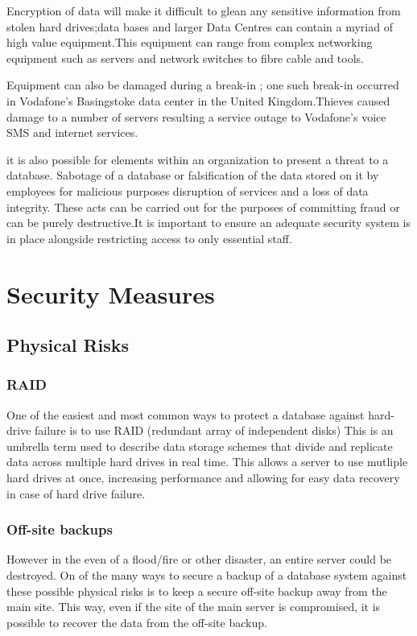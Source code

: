 \documentclass[11pt, twocolumn]{article}
\begin{document}
Encryption of data will make it  difficult to glean any sensitive information from stolen hard drives;data bases and larger Data Centres can contain a myriad of high value equipment.This equipment can range from complex networking equipment such as servers and network switches to fibre cable and tools.

Equipment can also be damaged during a break-in ; one such break-in occurred in Vodafone’s Basingstoke data center in the United Kingdom\cite{sean8}.Thieves caused damage to a number of servers resulting a service outage to Vodafone's voice SMS and internet services.

it is also possible for elements within an organization to present a threat to a database. Sabotage of a database or falsification of the data stored on it by  employees for malicious purposes disruption of services and a loss of data integrity. These acts can be carried out for the purposes of committing fraud or can be purely destructive.It is important to ensure an adequate security system is in place alongside restricting access to only essential staff.


\section{Security Measures}
\subsection{Physical Risks}

\subsubsection{RAID}

One of the easiest and most common ways to protect a database against hard-drive failure is to use RAID (redundant array of independent disks)\cite{raid} This is an umbrella term used to describe data storage schemes that divide and replicate data across multiple hard drives in real time. This allows a server to use mutliple hard drives at once, increasing performance and allowing for easy data recovery in case of hard drive failure.

\subsubsection{Off-site backups}

However in the even of a flood/fire or other disaster, an entire server could be destroyed. On of the many ways to secure a backup of a database system against these possible physical risks is to keep a secure off-site backup away from the main site. This way, even if the site of the main server is compromised, it is possible to recover the data from the off-site backup.
\end{document}
